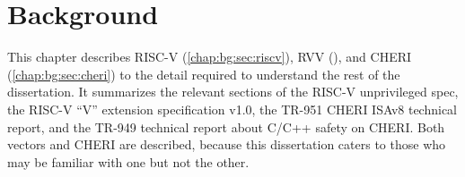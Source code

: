 \chapter{Background\label{chap:background}}

This chapter describes RISC-V (\cref{chap:bg:sec:riscv}), RVV (), and CHERI (\cref{chap:bg:sec:cheri}) to the detail required to understand the rest of the dissertation.
It summarizes the relevant sections of the RISC-V unprivileged spec, the RISC-V ``V'' extension specification v1.0, the TR-951 CHERI ISAv8 technical report\cite[Chapters 5, 8]{TR-951}, and the TR-949 technical report about C/C++ safety on CHERI\cite[Section 4.4, Appendix C]{TR-949}.
Both vectors and CHERI are described, because this dissertation caters to those who may be familiar with one but not the other.


\pagebreak


\pagebreak

\pagebreak

\pagebreak


